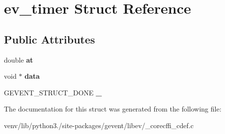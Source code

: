 \hypertarget{structev__timer}{}\section{ev\+\_\+timer Struct Reference}
\label{structev__timer}
\subsection*{Public Attributes}
\begin{DoxyCompactItemize}
\item 
\mbox{\label{structev__timer_a3c4d784318abecea4b86b25a4fc15305}} 
double {\bfseries at}
\item 
\mbox{\label{structev__timer_a33342beaca845a99db71199f3ffc851b}} 
void $\ast$ {\bfseries data}
\item 
\mbox{\label{structev__timer_a7f70f447d07b74699349ec9076c95e93}} 
G\+E\+V\+E\+N\+T\+\_\+\+S\+T\+R\+U\+C\+T\+\_\+\+D\+O\+NE {\bfseries \+\_\+}
\end{DoxyCompactItemize}


The documentation for this struct was generated from the following file\+:\begin{DoxyCompactItemize}
\item 
venv/lib/python3./site-\/packages/gevent/libev/\+\_\+corecffi\+\_\+cdef.\+c\end{DoxyCompactItemize}
